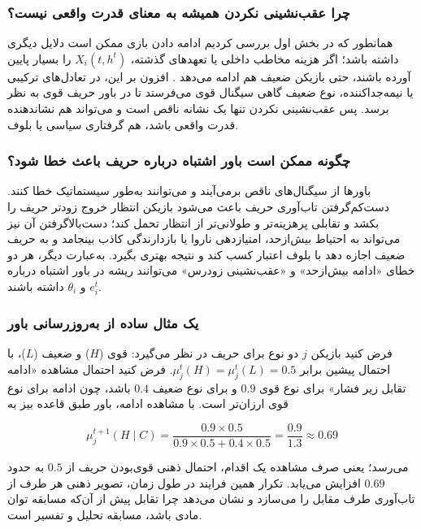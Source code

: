 \documentclass[12pt]{article}
\begin{document}
\subsubsection*{چرا عقب‌نشینی نکردن همیشه به معنای قدرت واقعی نیست؟}
همانطور که در بخش اول بررسی کردیم ادامه دادن بازی ممکن است دلایل دیگری داشته باشد؛
  اگر هزینه مخاطب داخلی یا تعهدهای گذشته، $X_i(t,h^t)$
   را بسیار پایین آورده باشند، حتی بازیکن ضعیف هم ادامه می‌دهد .
    افزون بر این، در تعادل‌های ترکیبی یا نیمه‌جداکننده، نوع
    ضعیف گاهی سیگنال قوی می‌فرستد تا در باور حریف
    قوی به نظر برسد.
     پس عقب‌نشینی نکردن تنها
    یک نشانه ناقص است و می‌تواند هم نشاندهنده قدرت واقعی
    باشد، هم گرفتاری سیاسی یا بلوف.

\subsubsection*{چگونه ممکن است باور اشتباه درباره حریف باعث خطا شود؟}

باورها از سیگنال‌های ناقص برمی‌آیند و می‌توانند به‌طور سیستماتیک خطا کنند.
 دست‌کم‌گرفتن تاب‌آوری حریف باعث می‌شود بازیکن انتظار خروج زودتر
 حریف را بکشد و تقابلی پرهزینه‌تر و طولانی‌تر از انتظار تحمل کند؛
 دست‌بالاگرفتن آن نیز می‌تواند به احتیاط بیش‌ازحد، امتیازدهی ناروا
 یا بازدارندگی کاذب بینجامد و به حریف ضعیف اجازه دهد
 با بلوف اعتبار کسب کند و نتیجه بهتری بگیرد. به‌عبارت دیگر، هر دو خطای «ادامه بیش‌ازحد»
 و «عقب‌نشینی زودرس» می‌توانند ریشه در باور اشتباه درباره $e_i^t$
  و $\theta_i$
   داشته باشند.

\subsubsection*{یک مثال ساده از به‌روزرسانی باور}

فرض کنید بازیکن $j$ دو نوع برای حریف در نظر می‌گیرد: قوی 
($H$) و ضعیف ($L$)، با احتمال پیشین برابر $\mu_j^t(H) = \mu_j^t(L) = 0.5$.
 فرض کنید احتمال مشاهده «ادامه تقابل زیر فشار» برای نوع قوی $0.9$
  و برای نوع ضعیف $0.4$ 
  باشد، چون ادامه برای نوع قوی ارزان‌تر است. با مشاهده ادامه، باور طبق قاعده بیز به

\begin{equation*}
    \mu_j^{t+1}(H \mid C) = \frac{0.9 \times 0.5}{0.9 \times 0.5 + 0.4 \times 0.5} = \frac{0.9}{1.3} \approx 0.69
\end{equation*}

می‌رسد؛
 یعنی صرف مشاهده یک اقدام، احتمال ذهنی قوی‌بودن حریف از $0.5$
  به حدود $0.69$
   افزایش می‌یابد. تکرار همین فرایند 
   در طول زمان، تصویر ذهنی هر طرف از تاب‌آوری طرف مقابل را می‌سازد
    و نشان می‌دهد چرا تقابل پیش از آن‌که مسابقه توان مادی باشد،
    مسابقه تحلیل و تفسیر است.
\end{document}
